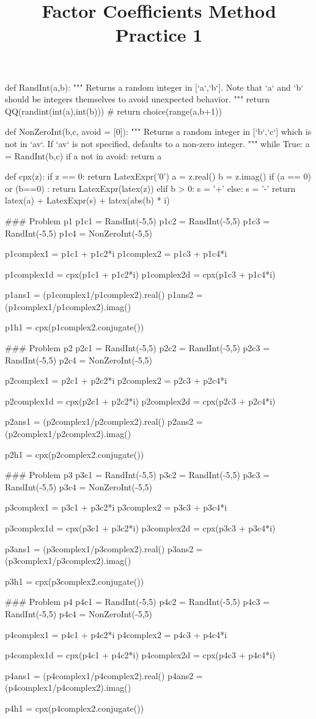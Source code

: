 \documentclass{ximera}
\title{Factor Coefficients Method Practice 1}
\begin{document}


\begin{sagesilent}
def RandInt(a,b):
    """ Returns a random integer in [`a`,`b`]. Note that `a` and `b` should be integers themselves to avoid unexpected behavior.
    """
    return QQ(randint(int(a),int(b)))
    # return choice(range(a,b+1))

def NonZeroInt(b,c, avoid = [0]):
    """ Returns a random integer in [`b`,`c`] which is not in `av`. 
        If `av` is not specified, defaults to a non-zero integer.
    """
    while True:
        a = RandInt(b,c)
        if a not in avoid:
            return a

def cpx(z):
    if z == 0:
        return LatexExpr('0')
    a = z.real()
    b = z.imag()
    if (a == 0) or (b==0) :
        return LatexExpr(latex(z))
    elif b > 0:
      s = '+'
    else:
      s = '-'
    return latex(a) + LatexExpr(s) + latex(abs(b) * i)



### Problem p1
p1c1 = RandInt(-5,5)
p1c2 = RandInt(-5,5)
p1c3 = RandInt(-5,5)
p1c4 = NonZeroInt(-5,5)

p1complex1 = p1c1 + p1c2*i
p1complex2 = p1c3 + p1c4*i

p1complex1d = cpx(p1c1 + p1c2*i)
p1complex2d = cpx(p1c3 + p1c4*i)

p1ans1 = (p1complex1/p1complex2).real()
p1ans2 = (p1complex1/p1complex2).imag()

p1h1 = cpx(p1complex2.conjugate())



### Problem p2
p2c1 = RandInt(-5,5)
p2c2 = RandInt(-5,5)
p2c3 = RandInt(-5,5)
p2c4 = NonZeroInt(-5,5)

p2complex1 = p2c1 + p2c2*i
p2complex2 = p2c3 + p2c4*i

p2complex1d = cpx(p2c1 + p2c2*i)
p2complex2d = cpx(p2c3 + p2c4*i)

p2ans1 = (p2complex1/p2complex2).real()
p2ans2 = (p2complex1/p2complex2).imag()

p2h1 = cpx(p2complex2.conjugate())


### Problem p3
p3c1 = RandInt(-5,5)
p3c2 = RandInt(-5,5)
p3c3 = RandInt(-5,5)
p3c4 = NonZeroInt(-5,5)

p3complex1 = p3c1 + p3c2*i
p3complex2 = p3c3 + p3c4*i

p3complex1d = cpx(p3c1 + p3c2*i)
p3complex2d = cpx(p3c3 + p3c4*i)

p3ans1 = (p3complex1/p3complex2).real()
p3ans2 = (p3complex1/p3complex2).imag()

p3h1 = cpx(p3complex2.conjugate())


### Problem p4
p4c1 = RandInt(-5,5)
p4c2 = RandInt(-5,5)
p4c3 = RandInt(-5,5)
p4c4 = NonZeroInt(-5,5)

p4complex1 = p4c1 + p4c2*i
p4complex2 = p4c3 + p4c4*i

p4complex1d = cpx(p4c1 + p4c2*i)
p4complex2d = cpx(p4c3 + p4c4*i)

p4ans1 = (p4complex1/p4complex2).real()
p4ans2 = (p4complex1/p4complex2).imag()

p4h1 = cpx(p4complex2.conjugate())




\end{sagesilent}
\end{document}
